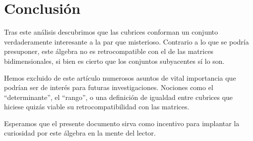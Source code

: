 \section{Conclusión}

Tras este análisis descubrimos que las cubrices conforman un conjunto verdaderamente interesante a la par que misterioso. Contrario a lo que se podría presuponer, este álgebra no es retrocompatible con el de las matrices bidimensionales, si bien es cierto que los conjuntos subyacentes sí lo son.

Hemos excluido de este artículo numerosos asuntos de vital importancia que podrían ser de interés para futuras investigaciones. Nociones como el ``determinante'', el ``rango'', o una definición de igualdad entre cubrices que hiciese quizás viable su retrocompatibilidad con las matrices.

Esperamos que el presente documento sirva como incentivo para implantar la curiosidad por este álgebra en la mente del lector.
